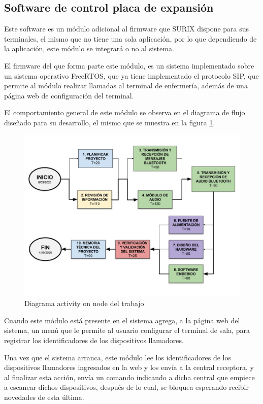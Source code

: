 \subsection{Software de control placa de expansión}
\label{subsec:SoftControl}

Este software es un módulo adicional al firmware que SURIX dispone para sus terminales, el mismo que no tiene una sola aplicación, por lo que dependiendo de la aplicación, este módulo se integrará o no al sistema.

El firmware del que forma parte este módulo, es un sistema implementado sobre un sistema operativo FreeRTOS, que ya tiene implementado el protocolo SIP, que permite al módulo realizar llamadas al terminal de enfermería, además de una página web de configuración del terminal.

El comportamiento general de este módulo se observa en el diagrama de flujo diseñado para su desarrollo, el mismo que se muestra en la figura \ref{fig:DiagramaSoftControl}.

\begin{figure}[htpb]
	\centering
	\includegraphics[scale=0.4]{./Figures/ActivityOnNode.jpg}
	\caption{Diagrama activity on node del trabajo}
	\label{fig:DiagramaSoftControl}
\end{figure}

Cuando este módulo está presente en el sistema agrega, a la página web del sistema, un menú que le permite al usuario configurar el terminal de sala, para registrar los identificadores de los dispositivos llamadores.

Una vez que el sistema arranca, este módulo lee los identificadores de los dispositivos llamadores ingresados en la web y los envía a la central receptora, y al finalizar esta acción, envía un comando indicando a dicha central que empiece a escanear dichos dispositivos, después de lo cual, se bloquea esperando recibir novedades de esta última.

